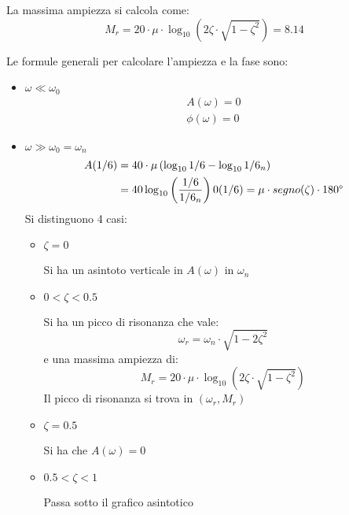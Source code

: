 \documentclass[a4paper]{article}
\begin{document}
La massima ampiezza si calcola come:
\[
  M_r = 20 \cdot \mu \cdot \log_{10} \left( 2 \zeta \cdot \sqrt{1 - \zeta^2} \right) = 8.14
\] 
\label{09-12-D9}

\vspace{1em}
\noindent
Le formule generali per calcolare l'ampiezza e la fase sono:
\begin{itemize}
  \item \( \omega \ll \omega_0 \) 
    \[
    \begin{aligned}
      A(\omega) = 0\\
      \phi(\omega) = 0
    \end{aligned}
    \] 
  \item \( \omega \gg \omega_0 = \omega_n \) 
    \[
    \begin{aligned}
      A(1/6) &= 40 \cdot \mu \left( \log_{10} 1/6 - \log_{10} 1/6_n \right) \\
                &= 40 \log_{10} \left( \frac{1/6}{1/6_n} \right) 
      0(1/6) = \mu \cdot segno(\zeta) \cdot 180\degree
    \end{aligned}
    \]
    Si distinguono 4 casi:
    \begin{itemize}
      \item \( \zeta = 0 \) 

        Si ha un asintoto verticale in \( A(\omega) \) in \( \omega_n \)

      \item \( 0 < \zeta < 0.5 \)

        Si ha un picco di risonanza che vale:
        \[
          \omega_r = \omega_n \cdot \sqrt{1 - 2 \zeta^2}
        \] 
        e una massima ampiezza di:
        \[
          M_r = 20 \cdot \mu \cdot \log_{10} \left( 2 \zeta \cdot \sqrt{1 - \zeta^2} \right)
        \]
        Il picco di risonanza si trova in \( \left( \omega_r, M_r \right)  \) 

      \item \( \zeta = 0.5 \)

        Si ha che \( A(\omega) = 0\) 

      \item \( 0.5 < \zeta < 1 \) 

        Passa sotto il grafico asintotico
    \end{itemize}
\end{itemize}
\end{document}
